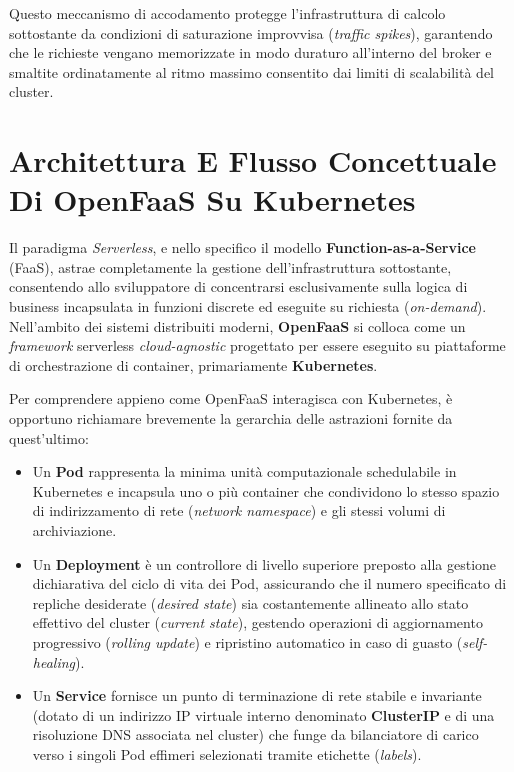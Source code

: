 \documentclass[11pt, a4paper]{article}
\begin{document}
Questo meccanismo di accodamento protegge l'infrastruttura di calcolo sottostante da condizioni di saturazione improvvisa (\emph{traffic spikes}), garantendo che le richieste vengano memorizzate in modo duraturo all'interno del broker e smaltite ordinatamente al ritmo massimo consentito dai limiti di scalabilità del cluster.


\section{Architettura E Flusso Concettuale Di OpenFaaS Su Kubernetes}

Il paradigma \emph{Serverless}, e nello specifico il modello \textbf{Function-as-a-Service} (FaaS), astrae completamente la gestione dell'infrastruttura sottostante, consentendo allo sviluppatore di concentrarsi esclusivamente sulla logica di business incapsulata in funzioni discrete ed eseguite su richiesta (\emph{on-demand}). Nell'ambito dei sistemi distribuiti moderni, \textbf{OpenFaaS} si colloca come un \emph{framework} serverless \emph{cloud-agnostic} progettato per essere eseguito su piattaforme di orchestrazione di container, primariamente \textbf{Kubernetes}.

Per comprendere appieno come OpenFaaS interagisca con Kubernetes, è opportuno richiamare brevemente la gerarchia delle astrazioni fornite da quest'ultimo:
\begin{itemize}
    \item Un \textbf{Pod} rappresenta la minima unità computazionale schedulabile in Kubernetes e incapsula uno o più container che condividono lo stesso spazio di indirizzamento di rete (\emph{network namespace}) e gli stessi volumi di archiviazione.
    \item Un \textbf{Deployment} è un controllore di livello superiore preposto alla gestione dichiarativa del ciclo di vita dei Pod, assicurando che il numero specificato di repliche desiderate (\emph{desired state}) sia costantemente allineato allo stato effettivo del cluster (\emph{current state}), gestendo operazioni di aggiornamento progressivo (\emph{rolling update}) e ripristino automatico in caso di guasto (\emph{self-healing}).
    \item Un \textbf{Service} fornisce un punto di terminazione di rete stabile e invariante (dotato di un indirizzo IP virtuale interno denominato \textbf{ClusterIP} e di una risoluzione DNS associata nel cluster) che funge da bilanciatore di carico verso i singoli Pod effimeri selezionati tramite etichette (\emph{labels}).
\end{itemize}
\end{document}
